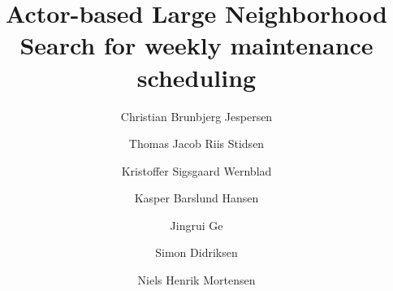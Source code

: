 \documentclass[preprint,12pt,authoryear]{elsarticle}
\begin{document}
\begin{frontmatter}



\title{Actor-based Large Neighborhood Search for weekly maintenance scheduling} %


\author{Christian Brunbjerg Jespersen} %
\author{Thomas Jacob Riis Stidsen}
\author{Kristoffer Sigsgaard Wernblad}
\author{Kasper Barslund Hansen}
\author{Jingrui Ge}
\author{Simon Didriksen}
\author{Niels Henrik Mortensen}


\end{frontmatter}
\end{document}

